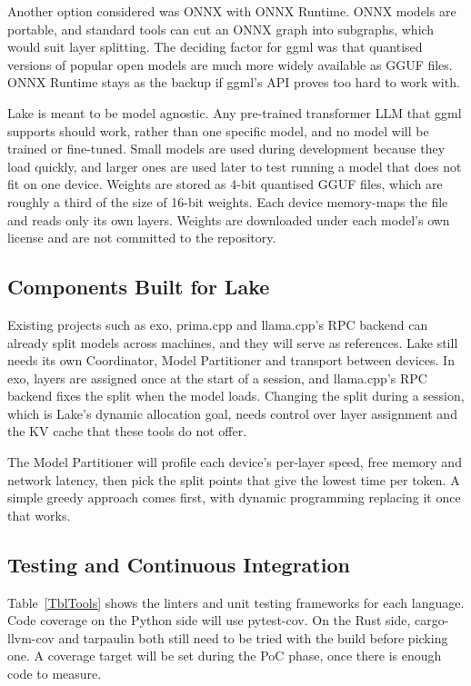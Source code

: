 \documentclass{article}
\begin{document}
Another option considered was ONNX with ONNX Runtime. ONNX models are
portable, and standard tools can cut an ONNX graph into subgraphs, which would
suit layer splitting. The deciding factor for ggml was that quantised versions of popular open
models are much more widely available as GGUF files. ONNX Runtime stays
as the backup if ggml's API proves too hard to work with.

Lake is meant to be model agnostic. Any pre-trained transformer LLM that ggml
supports should work, rather than one specific model, and no model will be
trained or fine-tuned. Small models are used during development because they
load quickly, and larger ones are used later to test running a model that does
not fit on one device. Weights are stored as 4-bit quantised GGUF files, which
are roughly a third of the size of 16-bit weights. Each device memory-maps the
file and reads only its own layers. Weights are downloaded under each model's
own license and are not committed to the repository.

\subsection{Components Built for Lake}

Existing projects such as exo, prima.cpp and llama.cpp's RPC backend can
already split models across machines, and they will serve as references. Lake
still needs its own Coordinator, Model Partitioner and transport between devices. In
exo, layers are assigned once at the start of a session, and llama.cpp's RPC
backend fixes the split when the model loads. Changing the split during a
session, which is Lake's dynamic allocation goal, needs control over layer
assignment and the KV cache that these tools do not offer.

The Model Partitioner will profile each device's per-layer speed, free memory and
network latency, then pick the split points that give the lowest time per
token. A simple greedy approach comes first, with dynamic programming
replacing it once that works.

\subsection{Testing and Continuous Integration}

Table~\ref{TblTools} shows the linters and unit testing frameworks for each
language. Code coverage on the Python side will use pytest-cov. On the Rust
side, cargo-llvm-cov and tarpaulin both still need to be tried with the build before
picking one. A coverage target will be set during the PoC phase, once there is
enough code to measure.
\end{document}
